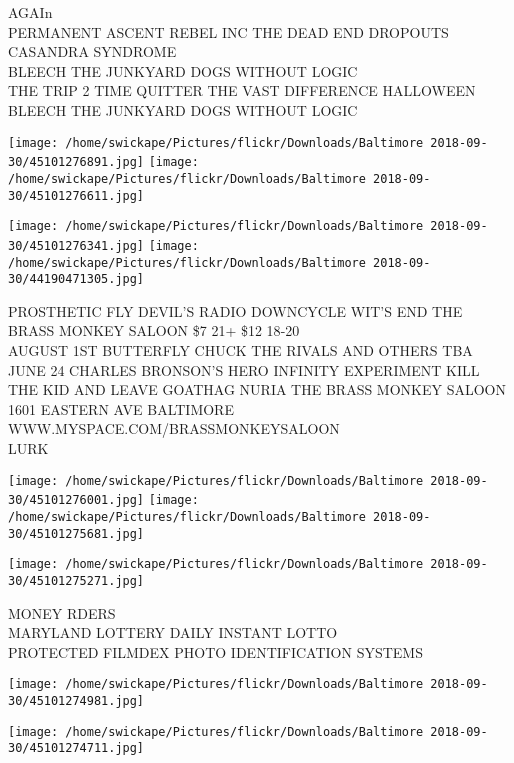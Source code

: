 \documentclass[10pt,letterpaper]{article}
\begin{document}
AGAIn\\
PERMANENT ASCENT REBEL INC THE DEAD END DROPOUTS CASANDRA SYNDROME\\
BLEECH THE JUNKYARD DOGS WITHOUT LOGIC\\
THE TRIP 2 TIME QUITTER THE VAST DIFFERENCE HALLOWEEN BLEECH THE JUNKYARD DOGS WITHOUT LOGIC\\
\pagebreak

\texttt{[image: /home/swickape/Pictures/flickr/Downloads/Baltimore 2018-09-30/45101276891.jpg]}
\texttt{[image: /home/swickape/Pictures/flickr/Downloads/Baltimore 2018-09-30/45101276611.jpg]}

\texttt{[image: /home/swickape/Pictures/flickr/Downloads/Baltimore 2018-09-30/45101276341.jpg]}
\texttt{[image: /home/swickape/Pictures/flickr/Downloads/Baltimore 2018-09-30/44190471305.jpg]}

PROSTHETIC FLY DEVIL'S RADIO DOWNCYCLE WIT'S END THE BRASS MONKEY SALOON \$7 21+ \$12 18{-}20\\
AUGUST 1ST BUTTERFLY CHUCK THE RIVALS AND OTHERS TBA\\
JUNE 24 CHARLES BRONSON'S HERO INFINITY EXPERIMENT KILL THE KID AND LEAVE GOATHAG NURIA THE BRASS MONKEY SALOON 1601 EASTERN AVE BALTIMORE WWW.MYSPACE.COM/BRASSMONKEYSALOON\\
LURK\\
\pagebreak

\texttt{[image: /home/swickape/Pictures/flickr/Downloads/Baltimore 2018-09-30/45101276001.jpg]}
\texttt{[image: /home/swickape/Pictures/flickr/Downloads/Baltimore 2018-09-30/45101275681.jpg]}

\vspace{0.25in}
\texttt{[image: /home/swickape/Pictures/flickr/Downloads/Baltimore 2018-09-30/45101275271.jpg]}

MONEY RDERS\\
MARYLAND LOTTERY DAILY INSTANT LOTTO\\
PROTECTED FILMDEX PHOTO IDENTIFICATION SYSTEMS\\
\pagebreak

\texttt{[image: /home/swickape/Pictures/flickr/Downloads/Baltimore 2018-09-30/45101274981.jpg]}

\vspace{0.25in}
\texttt{[image: /home/swickape/Pictures/flickr/Downloads/Baltimore 2018-09-30/45101274711.jpg]}
\end{document}
